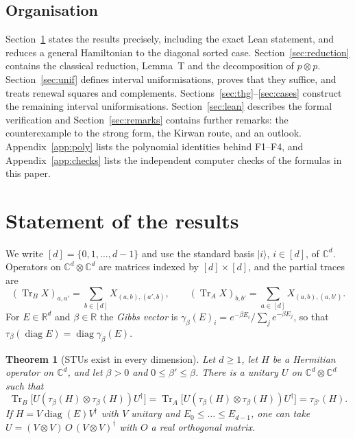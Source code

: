 \documentclass[11pt]{amsart}
\newtheorem{mainthm}{Theorem}
\theoremstyle{definition}
\theoremstyle{remark}
\numberwithin{equation}{section}
\newcommand{\R}{\mathbb{R}}
\newcommand{\C}{\mathbb{C}}
\newcommand{\Tr}{\operatorname{Tr}}
\newcommand{\diag}{\operatorname{diag}}
\begin{document}
\subsection{Organisation}
Section~\ref{sec:statement} states the results precisely, including the exact Lean statement, and
reduces a general Hamiltonian to the diagonal sorted case. Section~\ref{sec:reduction} contains the
classical reduction, Lemma~T and the decomposition of $p\otimes p$. Section~\ref{sec:unif} defines
interval uniformisations, proves that they suffice, and treats renewal squares and complements.
Sections~\ref{sec:thg}--\ref{sec:cases} construct the remaining interval uniformisations.
Section~\ref{sec:lean} describes the formal verification and Section~\ref{sec:remarks} contains
further remarks: the counterexample to the strong form, the Kirwan route, and an outlook.
Appendix~\ref{app:poly} lists the polynomial identities behind F1--F4, and Appendix~\ref{app:checks}
lists the independent computer checks of the formulas in this paper.

\section{Statement of the results}\label{sec:statement}

We write $[d]=\{0,1,\dots,d-1\}$ and use the standard basis $|i\rangle$, $i\in[d]$, of $\C^d$.
Operators on $\C^d\otimes\C^d$ are matrices indexed by $[d]\times[d]$, and the partial traces are
\[
  (\Tr_B X)_{a,a'}=\sum_{b\in[d]}X_{(a,b),(a',b)},\qquad
  (\Tr_A X)_{b,b'}=\sum_{a\in[d]}X_{(a,b),(a,b')} .
\]
For $E\in\R^d$ and $\beta\in\R$ the \emph{Gibbs vector} is
$\gamma_\beta(E)_i=e^{-\beta E_i}/\sum_{j}e^{-\beta E_j}$, so that
$\tau_\beta(\diag E)=\diag\gamma_\beta(E)$.

\begin{mainthm}[STUs exist in every dimension]\label{thm:main}
Let $d\ge1$, let $H$ be a Hermitian operator on $\C^d$, and let $\beta>0$ and $0\le\beta'\le\beta$.
There is a unitary $U$ on $\C^d\otimes\C^d$ such that
\[
  \Tr_B\bigl[U(\tau_\beta(H)\otimes\tau_\beta(H))U^\dagger\bigr]
  =\Tr_A\bigl[U(\tau_\beta(H)\otimes\tau_\beta(H))U^\dagger\bigr]=\tau_{\beta'}(H) .
\]
If $H=V\diag(E)V^\dagger$ with $V$ unitary and $E_0\le\dots\le E_{d-1}$, one can take
$U=(V\otimes V)\,O\,(V\otimes V)^\dagger$ with $O$ a real orthogonal matrix.
\end{mainthm}
\end{document}
